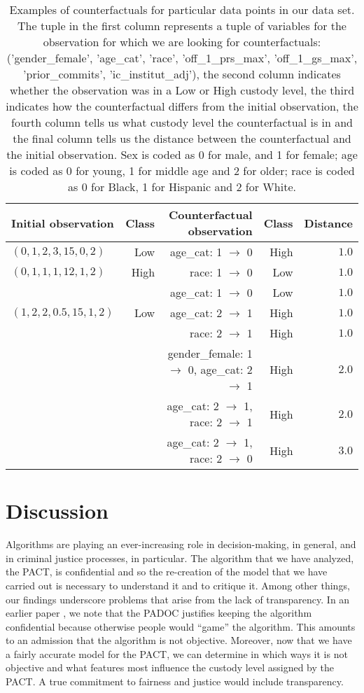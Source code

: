 \documentclass{amsproc}
\numberwithin{equation}{section}
\theoremstyle{plain}
\theoremstyle{remark}
\begin{document}
\begin{table} %
\small 
\begin{tabular}{|l||r|r|r|r|}\hline
Initial observation & Class & Counterfactual observation & Class & Distance\\\hline
$(0, 1, 2, 3, 15, 0, 2)$ & Low & age\_cat: 1 $\to$ 0 & High & $1.0$\\\hline
$(0, 1, 1, 1, 12, 1, 2)$ & High & race: 1 $\to$ 0 & Low & $1.0$\\
& & age\_cat: 1 $\to$ 0 & Low & $1.0$\\\hline
$(1, 2, 2, 0.5, 15, 1, 2)$ & Low & age\_cat: 2 $\to$ 1 & High & $1.0$\\
& & race: 2 $\to$ 1 & High & $1.0$\\
& & gender\_female: 1 $\to$ 0, age\_cat: 2 $\to$ 1 & High & $2.0$\\
& & age\_cat: 2 $\to$ 1, race: 2 $\to$ 1 & High & $2.0$\\
& & age\_cat: 2 $\to$ 1, race: 2 $\to$ 0 & High & $3.0$\\\hline 
\end{tabular}
\caption{Examples of counterfactuals for particular data points in our data set.  The tuple in the first column represents a tuple of variables for the observation for which we are looking for counterfactuals: ('gender\_female', 'age\_cat', 'race', 'off\_1\_prs\_max', 'off\_1\_gs\_max', 'prior\_commits', 'ic\_institut\_adj'), the second column indicates whether the observation was in a Low or High custody level, the third indicates how the counterfactual differs from the initial observation, the fourth column tells us what custody level the counterfactual is in and the final column tells us the distance between the counterfactual and the initial observation.  Sex is coded as 0 for male, and 1 for female; age is coded as 0 for young, 1 for middle age and 2 for older; race is coded as 0 for Black, 1 for Hispanic and 2 for White.}\label{tbl:cf-eg}
\end{table}



\section{Discussion}


Algorithms are playing an ever-increasing role in decision-making, in general, and in criminal justice processes, in particular.  The algorithm that we have analyzed, the PACT, is confidential and so the re-creation of the model that we have carried out is necessary to understand it and to critique it.  Among other things, our findings underscore problems that arise from the lack of transparency.  In an earlier paper \cite{dmmr1}, we note that the PADOC justifies keeping the algorithm confidential because otherwise people would ``game'' the algorithm.  This amounts to an admission that the algorithm is not objective.  Moreover, now that we have a fairly accurate model for the PACT, we can determine in which ways it is not objective and what features most influence the custody level assigned by the PACT.  A true commitment to fairness and justice would include transparency.
\end{document}
